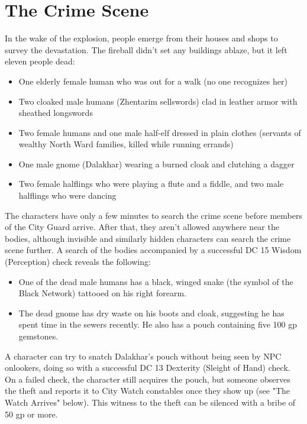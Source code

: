 \documentclass[10pt,a4paper,twoside,twocolumn,openany,nodeprecatedcode]{dndbook}
\begin{document}
\section{The Crime Scene}
In the wake of the explosion, people emerge from their houses and shops to survey the devastation. The fireball didn't set any buildings ablaze, but it left eleven people dead:
\begin{itemize}

\item One elderly female human who was out for a walk (no one recognizes her)
\item Two cloaked male humans (Zhentarim sellswords) clad in leather armor with sheathed longswords
\item Two female humans and one male half-elf dressed in plain clothes (servants of wealthy North Ward families, killed while running errands)
\item One male gnome (Dalakhar) wearing a burned cloak and clutching a dagger
\item Two female halflings who were playing a flute and a fiddle, and two male halflings who were dancing
\end{itemize}


The characters have only a few minutes to search the crime scene before members of the City Guard arrive. After that, they aren't allowed anywhere near the bodies, although invisible and similarly hidden characters can search the crime scene further. A search of the bodies accompanied by a successful DC 15 Wisdom (Perception) check reveals the following:
\begin{itemize}

\item One of the dead male humans has a black, winged snake (the symbol of the Black Network) tattooed on his right forearm.
\item The dead gnome has dry waste on his boots and cloak, suggesting he has spent time in the sewers recently. He also has a pouch containing five 100 gp gemstones.
\end{itemize}


A character can try to snatch Dalakhar's pouch without being seen by NPC onlookers, doing so with a successful DC 13 Dexterity (Sleight of Hand) check. On a failed check, the character still acquires the pouch, but someone observes the theft and reports it to City Watch constables once they show up (see "The Watch Arrives" below). This witness to the theft can be silenced with a bribe of 50 gp or more.
\end{document}
